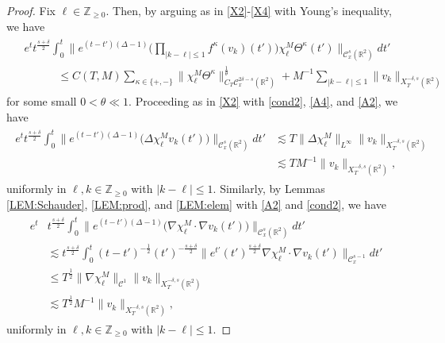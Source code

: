 \documentclass[letterpaper, 11pt,  reqno]{amsart}
\theoremstyle{myremark}
\newcommand{\Ta}{\Theta}
\newcommand{\1}{\hspace{0.5mm}\text{I}\hspace{0.5mm}}
\newcommand{\Z}{\mathbb{Z}}
\newcommand{\R}{\mathbb{R}}
\newcommand{\CC}{\mathcal{C}}
\newcommand{\dl}{\delta}
\newcommand{\nb}{\nabla}
\newcommand{\Dl}{\Delta}
\newcommand{\kk}{\kappa}
\newcommand{\ta}{\theta}
\renewcommand{\l}{\ell}
\newcommand{\les}{\lesssim}
\numberwithin{equation}{section}
\numberwithin{theorem}{section}
\begin{document}
\begin{proof}
Fix $\l \in \Z_{\ge 0}$.
Then, 
by arguing as in \eqref{X2}-\eqref{X4} 
with Young's inequality, we have 
\begin{align}
\begin{split}
& e^t t^{\frac{s+\dl}{2}} \int_0^t 
\bigg\| e^{(t-t')(\Dl - 1)} \bigg(\prod_{ |k - \l| \le 1} f^\kk(v_k)(t')\bigg) 
\chi^M_\l \Ta^\kk (t')\bigg\|_{\CC_x^s(\R^2)} dt'\\
& \qquad \quad \le C(T,M)  \sum_{\kk \in \{+, -\}} \|\chi^M_\l \Ta^\kk \|_{C_T \CC_x^{2\dl-s}(\R^2)}^\frac1 \ta + M^{-1} \sum_{ |k - \l| \le 1} \|v_k\|_{X^{-\dl,s}_T(\R^2)}
\end{split}
\label{Z3}
\end{align}
for some small $0 < \ta \ll 1$. 
Proceeding as in  \eqref{X2}
with \eqref{cond2}, \eqref{A4}, 
and  \eqref{A2}, we have
\begin{align}
\begin{split}
e^t t^{\frac{s+\dl}{2}} \int_0^t \big\| e^{(t-t')(\Dl - 1)} \big( \Dl \chi_\l^M v_k(t') \big) \big\|_{\CC_x^s(\R^2)} dt' 
& \les T \| \Dl \chi^M_\l \|_{L^\infty} \|v_k\|_{X^{-\dl,s}_T(\R^2)} \\
& \les T M^{-1}\|v_k\|_{X^{-\dl,s}_T(\R^2)}, 
\end{split}
\label{Z4}
\end{align}
uniformly in $\l, k \in \Z_{\ge 0}$ with $|k - \l |\le 1$.
Similarly, by Lemmas \ref{LEM:Schauder}, \ref{LEM:prod}, and \ref{LEM:elem}
with  \eqref{A2} and \eqref{cond2}, we have
\begin{align}
\begin{split}
 e^t & t^{\frac{s+\dl}{2}} \int_0^t \big\| e^{(t-t')(\Dl - 1)} 
 \big( \nb \chi_\l^M \cdot \nb v_k (t') \big) \big\|_{\CC_x^s(\R^2)} 
dt' \\
& \les  t^{\frac{s+\dl}{2}} \int_0^t (t-t')^{-\frac12} (t')^{-\frac{s+\dl}{2}}\| e^{t'} (t')^{\frac{s+\dl}{2}} \nb \chi_\l^M \cdot \nb v_k (t') \|_{\CC_x^{s-1}} dt' \\
& \le T^{\frac 12 } \| \nb \chi_\l^M \|_{\CC^1} \|v_k\|_{X^{-\dl,s}_T(\R^2)} \\
& \les T^{\frac 12 } M^{-1}\|v_k\|_{X^{-\dl,s}_T(\R^2)}, 
\end{split}
\label{Z5}
\end{align}
uniformly in $\l, k \in \Z_{\ge 0}$ with $|k - \l |\le 1$.



\end{proof}
\end{document}
